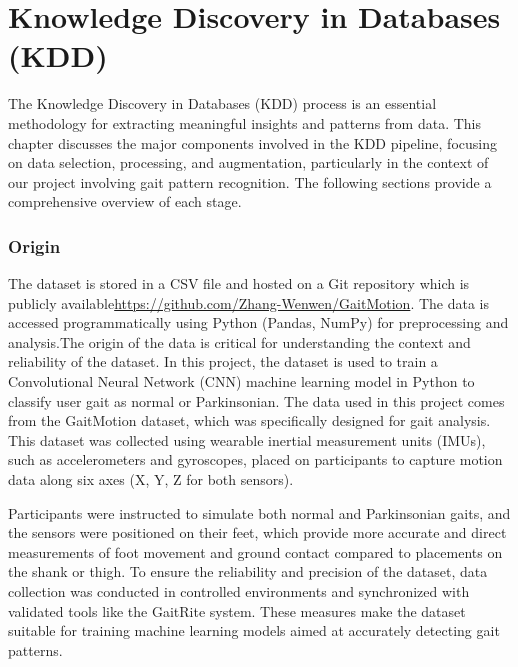 %
%
%
\chapter{Knowledge Discovery in Databases (KDD)}

The Knowledge Discovery in Databases (KDD) process is an essential methodology for extracting meaningful insights and patterns from data. This chapter discusses the major components involved in the KDD pipeline, focusing on data selection, processing, and augmentation, particularly in the context of our project involving gait pattern recognition. The following sections provide a comprehensive overview of each stage.

\subsection{Origin}
The dataset is stored in a CSV file and hosted on a Git repository which is publicly available\url{https://github.com/Zhang-Wenwen/GaitMotion}. The data is accessed programmatically using Python (Pandas, NumPy) for preprocessing and analysis.The origin of the data is critical for understanding the context and reliability of the dataset. In this project, the dataset is used to train a Convolutional Neural Network (CNN) machine learning model in Python to classify user gait as normal or Parkinsonian. The data used in this project comes from the GaitMotion dataset, which was specifically designed for gait analysis. This dataset was collected using wearable inertial measurement units (IMUs), such as accelerometers and gyroscopes, placed on participants to capture motion data along six axes (X, Y, Z for both sensors).

Participants were instructed to simulate both normal and Parkinsonian gaits, and the sensors were positioned on their feet, which provide more accurate and direct measurements of foot movement and ground contact compared to placements on the shank or thigh. To ensure the reliability and precision of the dataset, data collection was conducted in controlled environments and synchronized with validated tools like the GaitRite system\cite{Webster:2005}. These measures make the dataset suitable for training machine learning models aimed at accurately detecting gait patterns.\cite*{ZhangWenwen:2022}

